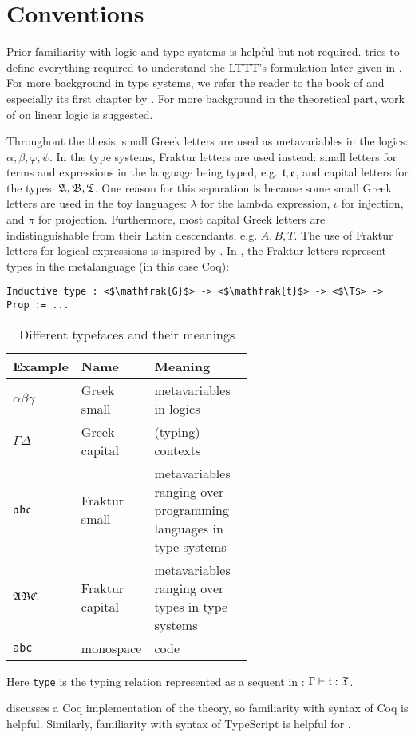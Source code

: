 \section{Conventions}

Prior familiarity with logic and type systems is helpful but not required.  tries to define everything required to understand the LTTT's formulation later given in . For more background in type systems, we refer the reader to the book of \cite{10.5555/1076265} and especially its first chapter by \cite{DavidWalker2004}. For more background in the theoretical part, work of \cite{DBLP:journals/tcs/Girard87} on linear logic is suggested.

Throughout the thesis, small Greek letters are used as metavariables in the logics: $\alpha, \beta, \varphi, \psi$. In the type systems, Fraktur letters are used instead: small letters for terms and expressions in the language being typed, e.g. $\mathfrak{t}, \mathfrak{e}$, and capital letters for the types: $\mathfrak{A}, \mathfrak{B}, \mathfrak{T}$. One reason for this separation is because some small Greek letters are used in the toy languages: $\lambda$ for the lambda expression, $\iota$ for injection, and $\pi$ for projection. Furthermore, most capital Greek letters are indistinguishable from their Latin descendants, e.g. $A, B, T$. The use of Fraktur letters for logical expressions is inspired by \cite{hilbert1928}.
In , the Fraktur letters represent types in the metalanguage (in this case Coq):

\begin{verbatim}
Inductive type : <$\mathfrak{G}$> -> <$\mathfrak{t}$> -> <$\T$> -> Prop := ...
\end{verbatim}

\begin{table}[t]
    \centering
    \begin{tabular}{l|l|p{0.6\linewidth}}
        Example & Name & Meaning  \\
        \hline
        $\alpha\beta\gamma$ & Greek small & metavariables in logics \\
        $\Gamma\Delta$ & Greek capital & (typing) contexts \\
        $\mathfrak{a}\mathfrak{b}\mathfrak{c}$ & Fraktur small & metavariables ranging over programming languages in type systems \\
        $\mathfrak{A}\mathfrak{B}\mathfrak{C}$ & Fraktur capital & metavariables ranging over types in type systems \\
        \texttt{abc} & monospace & code
    \end{tabular}
    \caption{Different typefaces and their meanings}
    \label{tab:fonts}
\end{table}

Here \texttt{type} is the typing relation represented as a sequent in : $\Gamma \vdash \mathfrak{t} : \mathfrak{T}$.

 discusses a Coq implementation of the theory, so familiarity with syntax of Coq is helpful. Similarly, familiarity with syntax of TypeScript is helpful for .